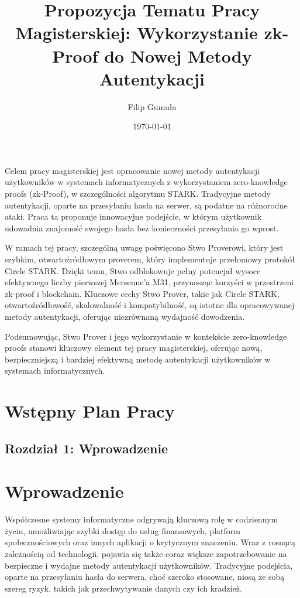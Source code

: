\documentclass{article}
\title{Propozycja Tematu Pracy Magisterskiej: Wykorzystanie zk-Proof do Nowej Metody Autentykacji}
\author{Filip Gumuła}
\date{\today}
\begin{document}
\maketitle

Celem pracy magisterskiej jest opracowanie nowej metody autentykacji użytkowników w systemach informatycznych z wykorzystaniem zero-knowledge proofs (zk-Proof), w szczególności algorytmu STARK. Tradycyjne metody autentykacji, oparte na przesyłaniu hasła na serwer, są podatne na różnorodne ataki. Praca ta proponuje innowacyjne podejście, w którym użytkownik udowadnia znajomość swojego hasła bez konieczności przesyłania go wprost.

W ramach tej pracy, szczególną uwagę poświęcono Stwo Proverowi, który jest szybkim, otwartoźródłowym proverem, 
który implementuje przełomowy protokół Circle STARK. Dzięki temu, Stwo odblokowuje pełny potencjał wysoce 
efektywnego liczby pierwszej Mersenne'a M31, przynosząc korzyści w przestrzeni zk-proof i blockchain. 
Kluczowe cechy Stwo Prover, takie jak Circle STARK, otwartoźródłowość, skalowalność i kompatybilność, 
są istotne dla opracowywanej metody autentykacji, oferując niezrównaną wydajność dowodzenia. 

Podsumowując, Stwo Prover i jego wykorzystanie w kontekście zero-knowledge proofs stanowi kluczowy element tej pracy magisterskiej, oferując nową, bezpieczniejszą i bardziej efektywną metodę autentykacji użytkowników w systemach informatycznych.

\section{Wstępny Plan Pracy}
\subsection{Rozdział 1: Wprowadzenie}
\section{Wprowadzenie}

Współczesne systemy informatyczne odgrywają kluczową rolę w codziennym życiu, umożliwiając szybki dostęp do usług finansowych, 
platform społecznościowych oraz innych aplikacji o krytycznym znaczeniu. Wraz z rosnącą zależnością od technologii, 
pojawia się także coraz większe zapotrzebowanie na bezpieczne i wydajne metody autentykacji użytkowników. 
Tradycyjne podejścia, oparte na przesyłaniu hasła do serwera, choć szeroko stosowane, niosą ze sobą szereg ryzyk, 
takich jak przechwytywanie danych czy ich kradzież.
\end{document}
